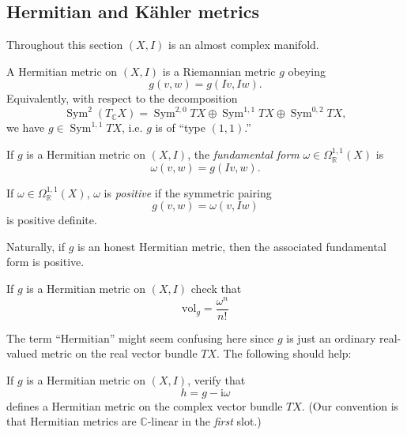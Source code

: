 \documentclass[12pt,letterpaper,reqno]{article}
\numberwithin{equation}{section}
\newcommand{\R}{\ensuremath{\mathbb R}}
\newcommand{\C}{\ensuremath{\mathbb C}}
\newcommand{\kahler}{K\"ahler\xspace}
\newcommand{\I}{{\mathrm i}}
\newcommand{\ti}[1]{\textit{#1}}
\DeclareMathOperator{\Sym}{Sym}
\begin{document}
\subsection{Hermitian and \kahler metrics}
Throughout this section $(X,I)$ is an almost complex manifold.

\begin{defn} A Hermitian metric on 
$(X,I)$ is a Riemannian metric $g$ obeying
$$ g(v,w) = g(Iv,Iw). $$
Equivalently, with respect to the decomposition 
\begin{equation}
  \Sym^2 (T_\C X) = \Sym^{2,0} TX \oplus \Sym^{1,1} TX \oplus \Sym^{0,2} TX,
\end{equation}
we have $g \in \Sym^{1,1} TX$, i.e. $g$ is of ``type $(1,1)$.''
\end{defn}

\begin{defn} If $g$ is a Hermitian metric on $(X,I)$, 
the \ti{fundamental form} $\omega \in \Omega^{1,1}_\R(X)$
is
\begin{equation}
  \omega(v,w) = g(Iv,w).
\end{equation}
\end{defn}

\begin{defn} If $\omega \in \Omega^{1,1}_\R(X)$,
$\omega$ is \ti{positive} if the symmetric pairing
\begin{equation}
   g(v,w) = \omega(v,Iw)
\end{equation} 
is positive definite.
\end{defn}

Naturally, if $g$ is an honest Hermitian metric, then the
associated fundamental form is positive.

\begin{exercise} If $g$ is a Hermitian metric on $(X,I)$ check that
\begin{equation}
  {\mathrm {vol}}_g = \frac{\omega^n}{n!}
\end{equation}
\end{exercise}

The term ``Hermitian'' might seem confusing here since $g$ is just 
an ordinary real-valued metric on the real vector bundle 
$TX$. The following should help:

\begin{exercise} \label{exc:hermitian-metric} 
If $g$ is a Hermitian metric on $(X,I)$,
verify that
\begin{equation}
  h = g - \I \omega
\end{equation}
defines a Hermitian metric
on the complex vector bundle $TX$.
(Our convention is that Hermitian metrics are
$\C$-linear in the \ti{first} slot.)
\end{exercise}
\end{document}

